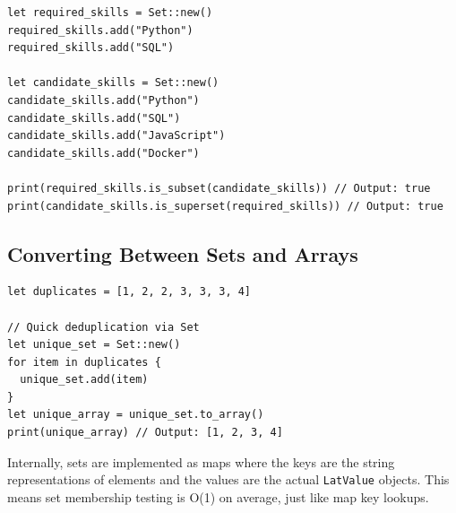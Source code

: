 \begin{lstlisting}[language=Lattice, caption={Subset and superset testing}]
let required_skills = Set::new()
required_skills.add("Python")
required_skills.add("SQL")

let candidate_skills = Set::new()
candidate_skills.add("Python")
candidate_skills.add("SQL")
candidate_skills.add("JavaScript")
candidate_skills.add("Docker")

print(required_skills.is_subset(candidate_skills)) // Output: true
print(candidate_skills.is_superset(required_skills)) // Output: true
\end{lstlisting}

\subsection{Converting Between Sets and Arrays}\label{sec:set-conversion}

\begin{lstlisting}[language=Lattice, caption={Set conversion}]
let duplicates = [1, 2, 2, 3, 3, 3, 4]

// Quick deduplication via Set
let unique_set = Set::new()
for item in duplicates {
  unique_set.add(item)
}
let unique_array = unique_set.to_array()
print(unique_array) // Output: [1, 2, 3, 4]
\end{lstlisting}

Internally, sets are implemented as maps where the keys are the string representations of elements and the values are the actual \lstinline|LatValue| objects. This means set membership testing is O(1) on average, just like map key lookups.

